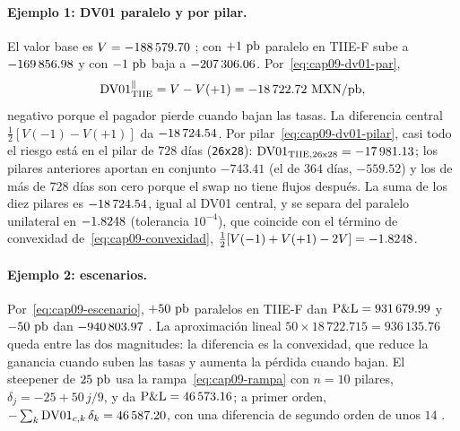 \paragraph{Ejemplo 1: DV01 paralelo y por pilar.} El valor base es $V=\verif{cap09-dv01-pv-base}{-188579.70}$ \MXN; con $+1~\pb$ paralelo en TIIE-F sube a $\verif{cap09-dv01-pv-mas1}{-169856.98}$ y con $-1~\pb$ baja a $\verif{cap09-dv01-pv-menos1}{-207306.06}$. Por~\eqref{eq:cap09-dv01-par},
\[
  \DVO^{\parallel}_{\cTIIE}=V-V(+1)=\verif{cap09-dv01-paralelo}{-18722.72}\ \MXN/\pb ,
\]
negativo porque el pagador pierde cuando bajan las tasas. La diferencia central $\tfrac12[V(-1)-V(+1)]$ da $\verif{cap09-dv01-central-paralelo}{-18724.54}$. Por pilar~\eqref{eq:cap09-dv01-pilar}, casi todo el riesgo está en el pilar de $728$ días (\texttt{26x28}): $\DVO_{\cTIIE,\mathrm{26x28}}=\verif{cap09-dv01-pilar-26x28}{-17981.13}$; los pilares anteriores aportan en conjunto $-743.41$ \MXN{} (el de $364$ días, $-559.52$) y los de más de $728$ días son cero porque el swap no tiene flujos después. La suma de los diez pilares es $\verif{cap09-dv01-suma-pilares}{-18724.54}$, igual al DV01 central, y se separa del paralelo unilateral en $\verif{cap09-dv01-diferencia}{-1.8248}$ \MXN{} (tolerancia $10^{-4}$), que coincide con el término de convexidad de~\eqref{eq:cap09-convexidad}, $\tfrac12[V(-1)+V(+1)-2V]=\verif{cap09-dv01-convexidad}{-1.8248}$.

\paragraph{Ejemplo 2: escenarios.} Por~\eqref{eq:cap09-escenario}, $+50~\pb$ paralelos en TIIE-F dan $\PnL=\verif{cap09-escenario-mas50}{931679.99}$ y $-50~\pb$ dan $\verif{cap09-escenario-menos50}{-940803.97}$ \MXN. La aproximación lineal $50\times18\,722.715=936\,135.76$ queda entre las dos magnitudes: la diferencia es la convexidad, que reduce la ganancia cuando suben las tasas y aumenta la pérdida cuando bajan. El steepener de $25~\pb$ usa la rampa~\eqref{eq:cap09-rampa} con $n=10$ pilares, $\delta_j=-25+50\,j/9$, y da $\PnL=\verif{cap09-escenario-steepener}{46573.16}$; a primer orden, $-\sum_k\DVO_{c,k}\,\delta_k=\verif{cap09-escenario-steepener-lineal}{46587.20}$, con una diferencia de segundo orden de unos $14$ \MXN.

